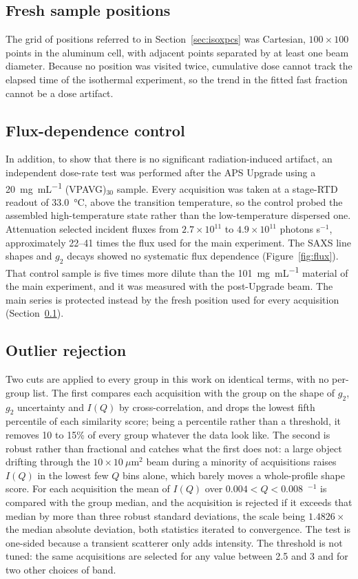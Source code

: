 \documentclass[11pt]{article}
\newcommand{\VPAVG}{(VPAVG)$_{30}$}
\newcommand{\Ainv}{\text{\AA}$^{-1}$}
\begin{document}
\subsection{Fresh sample positions}
\label{sec:freshspots}
The grid of positions referred to in Section~\ref{sec:isoxpcs} was Cartesian, $100\times100$ points in the aluminum cell, with adjacent points separated by at least one beam diameter. Because no position was visited twice, cumulative dose cannot track the elapsed time of the isothermal experiment, so the trend in the fitted fast fraction cannot be a dose artifact.

\subsection{Flux-dependence control}
In addition, to show that there is no significant radiation-induced artifact, an independent dose-rate test was performed after the APS Upgrade using a \SI{20}{\milli\gram\per\milli\liter} \VPAVG{} sample. Every acquisition was taken at a stage-RTD readout of \SI{33.0}{\degreeCelsius}, above the transition temperature, so the control probed the assembled high-temperature state rather than the low-temperature dispersed one. Attenuation selected incident fluxes from $2.7\times10^{11}$ to $4.9\times10^{11}$ photons s$^{-1}$, approximately 22--41 times the flux used for the main experiment. The SAXS line shapes and $g_2$ decays showed no systematic flux dependence (Figure~\ref{fig:flux}). That control sample is five times more dilute than the \SI{101}{\milli\gram\per\milli\liter} material of the main experiment, and it was measured with the post-Upgrade beam. The main series is protected instead by the fresh position used for every acquisition (Section~\ref{sec:freshspots}).

\subsection{Outlier rejection}
\label{sec:coldstate}
Two cuts are applied to every group in this work on identical terms, with no per-group list. The first compares each acquisition with the group on the shape of $g_2$, $g_2$ uncertainty and $I(Q)$ by cross-correlation, and drops the lowest fifth percentile of each similarity score; being a percentile rather than a threshold, it removes 10 to 15\% of every group whatever the data look like. The second is robust rather than fractional and catches what the first does not: a large object drifting through the $10\times10~\mu\mathrm{m}^{2}$ beam during a minority of acquisitions raises $I(Q)$ in the lowest few $Q$ bins alone, which barely moves a whole-profile shape score. For each acquisition the mean of $I(Q)$ over $0.004<Q<0.008$~\Ainv{} is compared with the group median, and the acquisition is rejected if it exceeds that median by more than three robust standard deviations, the scale being $1.4826\times$ the median absolute deviation, both statistics iterated to convergence. The test is one-sided because a transient scatterer only adds intensity. The threshold is not tuned: the same acquisitions are selected for any value between 2.5 and 3 and for two other choices of band.
\end{document}
